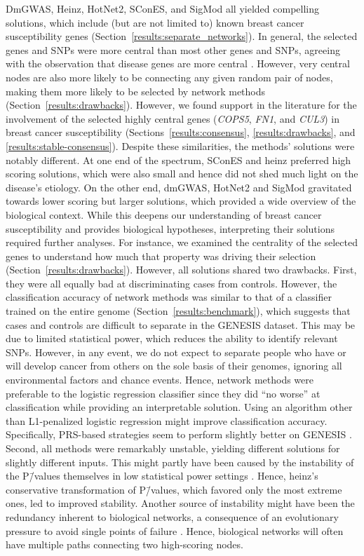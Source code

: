 \documentclass[10pt,letterpaper]{article}
\begin{document}
DmGWAS, Heinz, HotNet2, SConES, and SigMod all yielded compelling solutions, which include (but are not limited to) known breast cancer susceptibility genes (Section~\ref{results:separate_networks}). In general, the selected genes and SNPs were more central than most other genes and SNPs, agreeing with the observation that disease genes are more central \cite{pinero_uncovering_2016}. However, very central nodes are also more likely to be connecting any given random pair of nodes, making them more likely to be selected by network methods (Section~\ref{results:drawbacks}). However, we found support in the literature for the involvement of the selected highly central genes (\emph{COPS5}, \emph{FN1}, and \emph{CUL3}) in breast cancer susceptibility (Sections~\ref{results:consensus}, \ref{results:drawbacks}, and \ref{results:stable-consensus}). Despite these similarities, the methods' solutions were notably different. At one end of the spectrum, SConES and heinz preferred high scoring solutions, which were also small and hence did not shed much light on the disease's etiology. On the other end, dmGWAS, HotNet2 and SigMod gravitated towards lower scoring but larger solutions, which provided a wide overview of the biological context. While this deepens our understanding of breast cancer susceptibility and provides biological hypotheses, interpreting their solutions required further analyses. For instance, we examined the centrality of the selected genes to understand how much that property was driving their selection (Section~\ref{results:drawbacks}). However, all solutions shared two drawbacks. First, they were all equally bad at discriminating cases from controls. However, the classification accuracy of network methods was similar to that of a classifier trained on the entire genome (Section~\ref{results:benchmark}), which suggests that cases and controls are difficult to separate in the GENESIS dataset. This may be due to limited statistical power, which reduces the ability to identify relevant SNPs. However, in any event, we do not expect to separate people who have or will develop cancer from others on the sole basis of their genomes, ignoring all environmental factors and chance events. Hence, network methods were preferable to the logistic regression classifier since they did ``no worse'' at classification while providing an interpretable solution. Using an algorithm other than L1-penalized logistic regression might improve classification accuracy. Specifically, PRS-based strategies seem to perform slightly better on GENESIS \cite{lonjouGenePathwayLevel2021}. Second, all methods were remarkably unstable, yielding different solutions for slightly different inputs. This might partly have been caused by the instability of the P\=/values themselves in low statistical power settings \cite{halseyFickleValueGenerates2015}. Hence, heinz's conservative transformation of P\=/values, which favored only the most extreme ones, led to improved stability. Another source of instability might have been the redundancy inherent to biological networks, a consequence of an evolutionary pressure to avoid single points of failure \cite{wagnerAlternativeRoutesMutational2007}. Hence, biological networks will often have multiple paths connecting two high-scoring nodes. 
\end{document}
